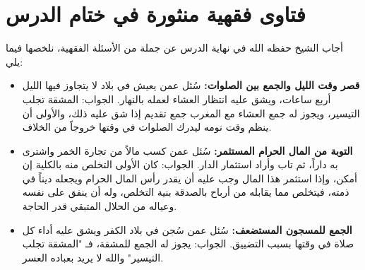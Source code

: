 \section{فتاوى فقهية منثورة في ختام الدرس}
أجاب الشيخ حفظه الله في نهاية الدرس عن جملة من الأسئلة الفقهية، نلخصها فيما يلي:
\begin{itemize}
    \item \textbf{قصر وقت الليل والجمع بين الصلوات:} سُئل عمن يعيش في بلاد لا يتجاوز فيها الليل أربع ساعات، ويشق عليه انتظار العشاء لعمله بالنهار. الجواب: المشقة تجلب التيسير، ويجوز له جمع العشاء مع المغرب جمع تقديم إذا شق عليه ذلك، والأولى أن ينظم وقت نومه ليدرك الصلوات في وقتها خروجاً من الخلاف.
    \item \textbf{التوبة من المال الحرام المستثمر:} سُئل عمن كسب مالاً من تجارة الخمر واشترى به داراً، ثم تاب وأراد استثمار الدار. الجواب: كان الأولى التخلص منه بالكلية إن أمكن، وإذا استثمر هذا المال وجب عليه أن يقدر رأس المال الحرام ويجعله ديناً في ذمته، فيتخلص مما يقابله من أرباح بالصدقة بنية التخلص، وله أن ينفق على نفسه وعياله من الحلال المتبقي قدر الحاجة.
    \item \textbf{الجمع للمسجون المستضعف:} سُئل عمن سُجن في بلاد الكفر ويشق عليه أداء كل صلاة في وقتها بسبب التضييق. الجواب: يجوز له الجمع للمشقة، فـ "المشقة تجلب التيسير" والله لا يريد بعباده العسر.
\end{itemize}